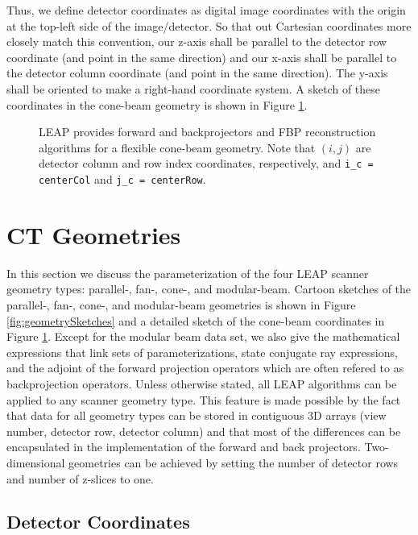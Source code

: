 \documentclass[11pt]{article}
\begin{document}
Thus, we define detector coordinates as digital image coordinates with the origin at the top-left side of the image/detector.  So that out Cartesian coordinates more closely match this convention, our z-axis shall be parallel to the detector row coordinate (and point in the same direction) and our x-axis shall be parallel to the detector column coordinate (and point in the same direction).  The y-axis shall be oriented to make a right-hand coordinate system.  A sketch of these coordinates in the cone-beam geometry is shown in Figure \ref{fig:coneBeamSketch}.

\begin{figure}[h]

\caption{LEAP provides forward and backprojectors and FBP reconstruction algorithms for a flexible cone-beam geometry.  Note that $(i,j)$ are detector column and row index coordinates, respectively, and \texttt{i_c = centerCol} and \texttt{j_c = centerRow}.} \label{fig:coneBeamSketch}
\end{figure}

\section{CT Geometries} \label{sec:CTGeometries}

In this section we discuss the parameterization of the four LEAP scanner geometry types: parallel-, fan-, cone-, and modular-beam.  Cartoon sketches of the parallel-, fan-, cone-, and modular-beam geometries is shown in Figure \ref{fig:geometrySketches} and a detailed sketch of the cone-beam coordinates in Figure \ref{fig:coneBeamSketch}.  Except for the modular beam data set, we also give the mathematical expressions that link sets of parameterizations, state conjugate ray expressions, and the adjoint of the forward projection operators which are often refered to as backprojection operators.  Unless otherwise stated, all LEAP algorithms can be applied to any scanner geometry type.  This feature is made possible by the fact that data for all geometry types can be stored in contiguous 3D arrays (view number, detector row, detector column) and that most of the differences can be encapsulated in the implementation of the forward and back projectors.  Two-dimensional geometries can be achieved by setting the number of detector rows and number of z-slices to one.

\subsection{Detector Coordinates} \label{sec:DetectorCoordinates}
\end{document}
